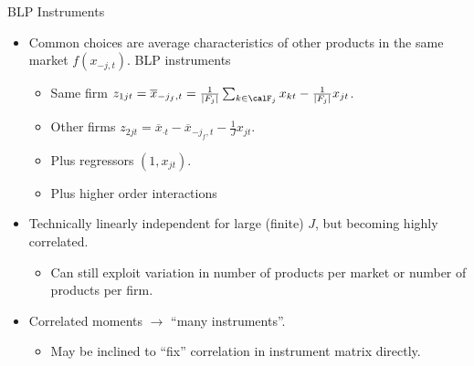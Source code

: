 \begin{frame}{BLP Instruments}
\begin{itemize}
\item Common choices are average characteristics of other products in the same market $f(x_{-j,t})$. \alert{BLP instruments}
\begin{itemize}
\item Same firm $z_{1jt} = \overline{x}_{-j_f,t} = \frac{1}{\left\vert{F_j}\right\vert}  \sum_{k \in \calF_j} x_{kt} - \frac{1}{\left\vert{F_j}\right\vert} x_{jt}$.
\item Other firms $z_{2jt}=\overline{x}_{\cdot t} - \overline{x}_{-j_f,t} - \frac{1}{J} x_{jt}$.
\item Plus regressors $(1, x_{jt})$.
\item Plus higher order interactions 
\end{itemize}
\item Technically linearly independent for large (finite) $J$, but becoming highly correlated.
\begin{itemize}
\item Can still exploit variation in number of products per market or number of products per firm.
\end{itemize}
\item Correlated moments $\rightarrow$ ``many instruments''.
\begin{itemize}
\item May be inclined to ``fix'' correlation in instrument matrix directly.
\end{itemize}
\end{itemize}
\end{frame}




